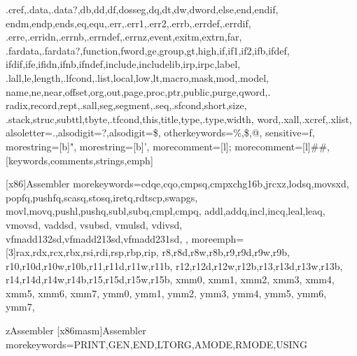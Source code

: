 {{      .cref,.data,.data?,db,dd,df,dosseg,dq,dt,dw,dword,else,end,endif,%
      endm,endp,ends,eq,equ,.err,.err1,.err2,.errb,.errdef,.errdif,%
      .erre,.erridn,.errnb,.errndef,.errnz,event,exitm,extrn,far,%
      .fardata,.fardata?,function,fword,ge,group,gt,high,if,if1,if2,ifb,ifdef,%
      ifdif,ife,ifidn,ifnb,ifndef,include,includelib,irp,irpc,label,%
      .lall,le,length,.lfcond,.list,local,low,lt,macro,mask,mod,.model,%
      name,ne,near,offset,org,out,page,proc,ptr,public,purge,qword,.%
      radix,record,rept,.sall,seg,segment,.seq,.sfcond,short,size,%
      .stack,struc,subttl,tbyte,.tfcond,this,title,type,.type,width,%
      word,.xall,.xcref,.xlist},%
   alsoletter=.,alsodigit=?,alsodigit=\$,%
   otherkeywords={\%,\$,@},%
   sensitive=f,%
   morestring=[b]",%
   morestring=[b]',%
   morecomment=[l];%
   morecomment=[l]##,%
   }[keywords,comments,strings,emph]

   [x86]{Assembler}        %
   {morekeywords={cdqe,cqo,cmpsq,cmpxchg16b,jrcxz,lodsq,movsxd, %
                  popfq,pushfq,scasq,stosq,iretq,rdtscp,swapgs, %
                  movl,movq,pushl,pushq,subl,subq,cmpl,cmpq,    %
                  addl,addq,incl,incq,leal,leaq,                %
                  vmovsd, vaddsd, vsubsd, vmulsd, vdivsd,       %
                  vfmadd132sd,vfmadd213sd,vfmadd231sd,          %
                },                                   %
   moreemph=[3]{rax,rdx,rcx,rbx,rsi,rdi,rsp,rbp,rip, %
                r8,r8d,r8w,r8b,r9,r9d,r9w,r9b,       %
                r10,r10d,r10w,r10b,r11,r11d,r11w,r11b,%
                r12,r12d,r12w,r12b,r13,r13d,r13w,r13b,%
                r14,r14d,r14w,r14b,r15,r15d,r15w,r15b,%
      xmm0, xmm1, xmm2, xmm3, xmm4, xmm5, xmm6, xmm7,%
      ymm0, ymm1, ymm2, ymm3, ymm4, ymm5, ymm6, ymm7,%
    }} %


\lstdefinelanguage
   {zAssembler}     %
   [x86masm]{Assembler} 
   {morekeywords={PRINT,GEN,END,LTORG,AMODE,RMODE,USING
                 }}




